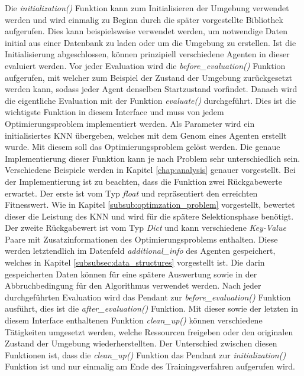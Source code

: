 Die \emph{initialization()} Funktion kann zum Initialisieren der Umgebung verwendet werden und wird einmalig zu Beginn durch die später vorgestellte Bibliothek aufgerufen. Dies kann beispielsweise verwendet werden, um notwendige Daten initial aus einer Datenbank zu laden oder um die Umgebung zu erstellen. Ist die Initialisierung abgeschlossen, können prinzipiell verschiedene Agenten in dieser evaluiert werden. Vor jeder Evaluation wird die \emph{ before\_evaluation()} Funktion aufgerufen, mit welcher zum Beispiel der Zustand der Umgebung zurückgesetzt werden kann, sodass jeder Agent denselben Startzustand vorfindet. Danach wird die eigentliche Evaluation mit der Funktion \emph{evaluate()} durchgeführt. Dies ist die wichtigste Funktion in diesem Interface und muss von jedem Optimierungsproblem implementiert werden. Als Parameter wird ein initialisiertes \ac{KNN} übergeben, welches mit dem Genom eines Agenten erstellt wurde. Mit diesem soll das Optimierungsproblem gelöst werden. Die genaue Implementierung dieser Funktion kann je nach Problem sehr unterschiedlich sein. Verschiedene Beispiele werden in Kapitel \ref{chap:analysis} genauer vorgestellt. Bei der Implementierung ist zu beachten, dass die Funktion zwei Rückgabewerte erwartet. Der erste ist vom Typ \emph{float} und repräsentiert den erreichten Fitnesswert. Wie in Kapitel \ref{subsub:optimzation_problem} vorgestellt, bewertet dieser die Leistung des \ac{KNN} und wird für die spätere Selektionsphase benötigt. Der zweite Rückgabewert ist vom Typ \emph{Dict} und kann verschiedene \emph{Key-Value} Paare mit Zusatzinformationen des Optimierungsproblems enthalten. Diese werden letztendlich im Datenfeld \emph{additional\_info} des Agenten gespeichert, welches in Kapitel \ref{subsubsec:data_structures} vorgestellt ist. Die darin gespeicherten Daten können für eine spätere Auswertung sowie in der Abbruchbedingung für den Algorithmus verwendet werden. Nach jeder durchgeführten Evaluation wird das Pendant zur \emph{before\_evaluation()} Funktion ausführt, dies ist die \emph{after\_evaluation()} Funktion. Mit dieser sowie der letzten in diesem Interface enthaltenen Funktion \emph{clean\_up()} können verschiedene Tätigkeiten umgesetzt werden, welche Ressourcen freigeben oder den originalen Zustand der Umgebung wiederherstellten. Der Unterschied zwischen diesen Funktionen ist, dass die \emph{clean\_up()} Funktion das Pendant zur \emph{initialization()} Funktion ist und nur einmalig am Ende des Trainingsverfahren aufgerufen wird. 
 
